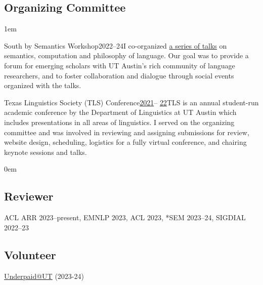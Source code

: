 \subsection{Organizing Committee}

\leftskip1em\relax

\smallentry
  {\large South by Semantics Workshop}{\large 2022--24}{I co-organized \href{https://sites.utexas.edu/sxsemantics/}{a series of talks} on semantics, computation and philosophy of language. Our goal was to provide a forum for emerging scholars with UT Austin's rich community of language researchers, and to foster collaboration and dialogue through social events organized with the talks.}
  
\smallentry
    {\large Texas Linguistics Society (TLS) Conference}{\large \href{http://tls.ling.utexas.edu/2021/}{2021}-- \href{http://tls.ling.utexas.edu/2022/}{22}}{TLS is an annual student-run academic conference by the Department of Linguistics at UT Austin which includes presentations in all areas of linguistics. I served on the organizing committee and was involved in reviewing and assigning submissions for review, website design, scheduling, logistics for a fully virtual conference, and chairing keynote sessions and talks.}

\leftskip0em\relax

\subsection{Reviewer}

\quad ACL ARR 2023--present, EMNLP 2023, ACL 2023, *SEM 2023--24, SIGDIAL 2022--23

\subsection{Volunteer}

\quad \href{http://underpaidatut.org}{Underpaid\makeatletter @\makeatother UT} (2023-24)
